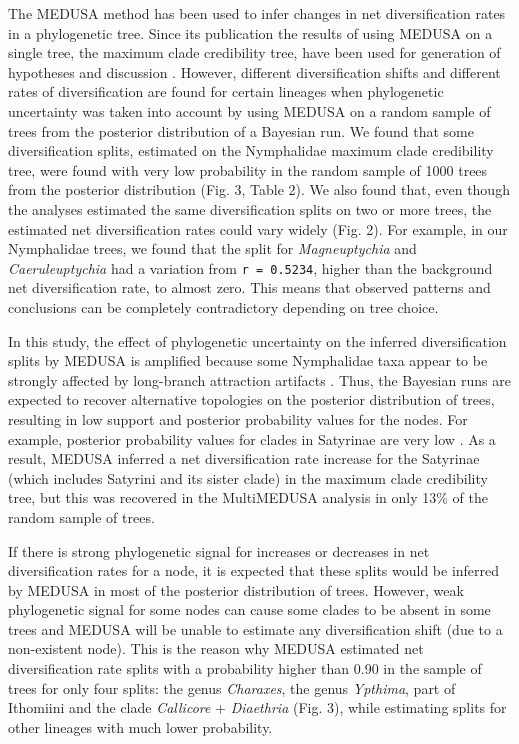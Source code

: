 \documentclass[10pt]{article}
\begin{document}
The MEDUSA method has been used to infer changes in net diversification
rates in a phylogenetic tree. Since its publication \cite{alfaro2009} the results
of using MEDUSA on a single tree, the maximum clade credibility tree,
have been used for generation of hypotheses and discussion
\cite{heikkila2012,litman2011,ryberg2012}. However, different diversification
shifts and different
rates of diversification are found for certain lineages when
phylogenetic uncertainty was taken into account by using MEDUSA on a
random sample of trees from the posterior distribution of a Bayesian
run. We found that some diversification splits, estimated on the
Nymphalidae maximum clade credibility tree, were found with very low
probability in the random sample of 1000 trees from the posterior
distribution (Fig. 3, Table 2). We also found that, even though the
analyses estimated the same diversification splits on two or more trees,
the estimated net diversification rates could vary widely (Fig. 2). For
example, in our Nymphalidae trees, we found that the split for
\emph{Magneuptychia} and \emph{Caeruleuptychia} had a variation from
\texttt{r = 0.5234}, higher than the background net diversification
rate, to almost zero. This means that observed patterns and conclusions
can be completely contradictory depending on tree choice.

In this study, the effect of phylogenetic uncertainty on the inferred
diversification splits by MEDUSA is amplified because some Nymphalidae
taxa appear to be strongly affected by long-branch attraction artifacts
\cite{pena2011}. Thus, the Bayesian runs are expected to recover alternative
topologies on the posterior distribution of trees, resulting in low
support and posterior probability values for the nodes. For example,
posterior probability values for clades in Satyrinae are very low
\cite{wahlberg2009}. As a result, MEDUSA inferred a net diversification rate
increase for the Satyrinae (which includes Satyrini and its sister clade)
in the maximum clade credibility tree, but
this was recovered in the MultiMEDUSA analysis in only 13\% of the
random sample of trees.

If there is strong phylogenetic signal for increases or decreases in net
diversification rates for a node, it is expected that these splits would
be inferred by MEDUSA in most of the posterior distribution of trees.
However, weak phylogenetic signal for some nodes can cause some clades
to be absent in some trees and MEDUSA will be unable to estimate any
diversification shift (due to a non-existent node). This is the reason
why MEDUSA estimated net diversification rate splits with a probability
higher than 0.90 in the sample of trees for only four splits: the genus
\emph{Charaxes}, the genus \emph{Ypthima}, part of Ithomiini and the
clade \emph{Callicore} + \emph{Diaethria} (Fig. 3), while estimating
splits for other lineages with much lower probability.
\end{document}
